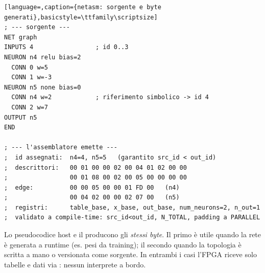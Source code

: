 \begin{lstlisting}[language=,caption={netasm: sorgente e byte generati},basicstyle=\ttfamily\scriptsize]
; --- sorgente ---
NET graph
INPUTS 4                 ; id 0..3
NEURON n4 relu bias=2
  CONN 0 w=5
  CONN 1 w=-3
NEURON n5 none bias=0
  CONN n4 w=2            ; riferimento simbolico -> id 4
  CONN 2 w=7
OUTPUT n5
END

; --- l'assemblatore emette ---
;  id assegnati:  n4=4, n5=5   (garantito src_id < out_id)
;  descrittori:   00 01 00 00 02 00 04 01 02 00 00
;                 00 01 08 00 02 00 05 00 00 00 00
;  edge:          00 00 05 00 00 01 FD 00   (n4)
;                 00 04 02 00 00 02 07 00   (n5)
;  registri:      table_base, x_base, out_base, num_neurons=2, n_out=1
;  validato a compile-time: src_id<out_id, N_TOTAL, padding a PARALLEL
\end{lstlisting}

\begin{fnnote}
Lo pseudocodice host e il  producono gli \emph{stessi byte}. Il primo è utile
quando la rete è generata a runtime (es. pesi da training); il secondo quando la topologia
è scritta a mano o versionata come sorgente. In entrambi i casi l'FPGA riceve solo tabelle
e dati via : nessun interprete a bordo.
\end{fnnote}
